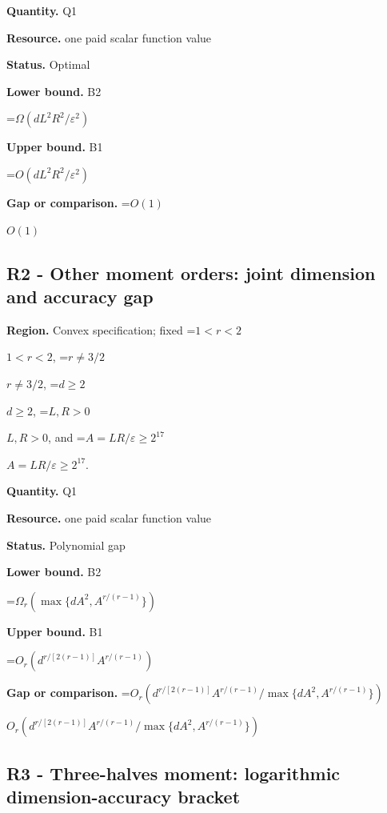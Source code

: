 \documentclass[10pt,a4paper]{article}
\newcommand{\AtlasMath}[1]{\par\begingroup\centering\setbox0=\hbox{$\displaystyle #1$}\ifdim\wd0>1.4\linewidth\typeout{ATLAS WIDE FORMULA: \the\wd0}\fi\ifdim\wd0>\linewidth\resizebox{\linewidth}{!}{\box0}\else\box0\fi\par\endgroup}
\newcommand{\AtlasInlineMath}[1]{\begingroup\setbox0=\hbox{$#1$}\ifdim\wd0>.4\linewidth\endgroup\AtlasMath{#1}\else\endgroup$#1$\fi}
\begin{document}
\textbf{Quantity.} Q1



\textbf{Resource.} one paid scalar function value



\textbf{Status.} Optimal



\textbf{Lower bound.} B2



\AtlasMath{\Omega(dL^2R^2/\varepsilon^2)}


\textbf{Upper bound.} B1



\AtlasMath{O(dL^2R^2/\varepsilon^2)}


\textbf{Gap or comparison.} \AtlasInlineMath{O(1)}



\subsection{R2 - Other moment orders: joint dimension and accuracy gap}


\textbf{Region.} Convex specification; fixed \AtlasInlineMath{1<r<2}, \AtlasInlineMath{r\ne3/2}, \AtlasInlineMath{d\ge2}, \AtlasInlineMath{L,R>0}, and \AtlasInlineMath{A=LR/\varepsilon\ge2^{17}}.



\textbf{Quantity.} Q1



\textbf{Resource.} one paid scalar function value



\textbf{Status.} Polynomial gap



\textbf{Lower bound.} B2



\AtlasMath{\Omega_r(\max\{dA^2,A^{r/(r-1)}\})}


\textbf{Upper bound.} B1



\AtlasMath{O_r(d^{r/[2(r-1)]}A^{r/(r-1)})}


\textbf{Gap or comparison.} \AtlasInlineMath{O_r(d^{r/[2(r-1)]}A^{r/(r-1)}/\max\{dA^2,A^{r/(r-1)}\})}



\subsection{R3 - Three-halves moment: logarithmic dimension-accuracy bracket}
\end{document}
